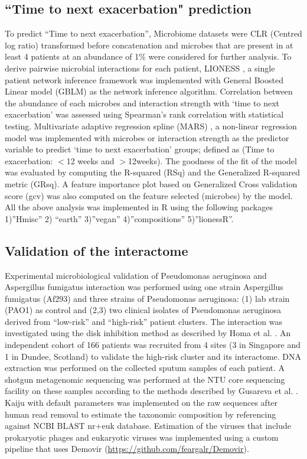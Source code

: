 \subsection{``Time to next exacerbation" prediction}

To predict “Time to next exacerbation”, Microbiome datasets were CLR (Centred log ratio) transformed before concatenation and microbes that are present in at least 4 patients at an abundance of 1\% were considered for further analysis. To derive pairwise microbial interactions for each patient, LIONESS \cite{Kuijjer2019}, a single patient network inference framework was implemented with General Boosted Linear model (GBLM) as the network inference algorithm. Correlation between the abundance of each microbes and interaction strength with ‘time to next exacerbation’ was assessed using Spearman’s rank correlation with statistical testing. Multivariate adaptive regression spline (MARS) \cite{Friedman1991}, a non-linear regression model was implemented with microbes or interaction strength as the predictor variable to predict ‘time to next exacerbation’ groups; defined as (Time to exacerbation: $<$12 weeks and $>$12weeks). The goodness of the fit of the model was evaluated by computing the R-squared (RSq) and the Generalized R-squared metric (GRsq). A feature importance plot based on Generalized Cross validation score (gcv) was also computed on the feature selected (microbes) by the model.  All the above analysis was implemented in R using the following packages 1)”Hmisc” 2) “earth” 3)”vegan” 4)”compositions” 5)”lionessR”.

\subsection{Validation of the interactome}

Experimental microbiological validation of Pseudomonas aeruginosa and Aspergillus fumigatus interaction was performed using one strain Aspergillus fumigatus (Af293) and three strains of Pseudomonas aeruginosa: (1) lab strain (PAO1) as control and (2,3) two clinical isolates of Pseudomonas aeruginosa derived from “low-risk” and “high-risk” patient clusters. The interaction was investigated using the disk inhibition method as described by Homa et al. \cite{Homa2019}.
An independent cohort of 166 patients was recruited from 4 sites (3 in Singapore and 1 in Dundee, Scotland) to validate the high-risk cluster and its interactome. DNA extraction was performed on the collected sputum samples of each patient. A shotgun metagenomic sequencing was performed at the NTU core sequencing facility on these samples according to the methods described by Gusareva et al. \cite{Gusareva2019}. Kaiju \cite{Menzel2016} with default parameters was implemented on the raw sequences after human read removal to estimate the taxonomic composition by referencing against NCBI BLAST nr+euk database. Estimation of the viruses that include prokaryotic phages and eukaryotic viruses was implemented using a custom pipeline that uses Demovir (\url{https://github.com/feargalr/Demovir}).